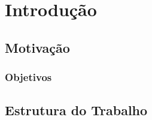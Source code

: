 

\chapter{Introdução}
\label{cap:intro} %

\lipsum[1]

\section{Motivação}
\label{sec:motivacao}

\lipsum[2-4]

\subsection{Objetivos}
\label{sec:objetivos}

\lipsum[2-5]

\section{Estrutura do Trabalho}
\label{sec:estrutura}

\lipsum[1]